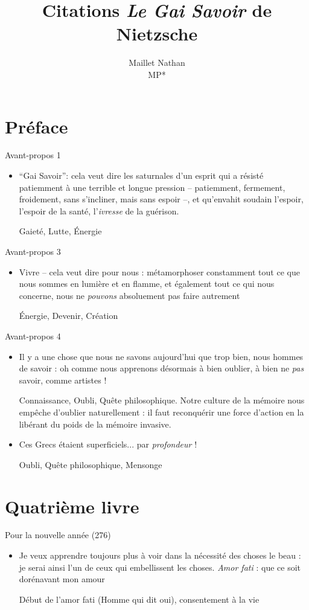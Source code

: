 \documentclass[french,a4paper,11pt,answers]{exam}
\title{Citations \emph{Le Gai Savoir} de Nietzsche}
\author{Maillet Nathan\\MP*}
\date{}
\newcommand{\cit}[2]{\og #1 \fg{} \begin{solution}{ #2 }\end{solution}} %
\begin{document}
	\maketitle
	\section{Préface}
	\begin{cadre}{Avant-propos 1}
		\begin{itemize}
			\item \cit{“Gai Savoir'': cela veut dire les saturnales d'un esprit qui a résisté patiemment à une terrible et longue pression -- patiemment, fermement, froidement, sans s'incliner, mais sans espoir --, et qu'envahit soudain l'espoir, l'espoir de la santé, l'\emph{ivresse} de la guérison.}
				{Gaieté, Lutte, Énergie}
		\end{itemize}
	\end{cadre}
	
	\begin{cadre}{Avant-propos 3}
		\begin{itemize}
			\item \cit{Vivre -- cela veut dire pour nous : métamorphoser constamment tout ce que nous sommes en lumière et en flamme, et également tout ce qui nous concerne, nous ne \emph{pouvons} absoluement pas faire autrement}
				{Énergie, Devenir, Création}
		\end{itemize}
	\end{cadre}

	\begin{cadre}{Avant-propos 4}
		\begin{itemize}
			\item \cit{Il y a une chose que nous ne savons aujourd'hui que trop bien, nous hommes de savoir : oh comme nous apprenons désormais à bien oublier, à bien ne \emph{pas} savoir, comme artistes !}
				{Connaissance, Oubli, Quête philosophique. Notre culture de la mémoire nous empêche d'oublier naturellement : il faut reconquérir une force d'action en la libérant du poids de la mémoire invasive.}
			\item \cit{Ces Grecs étaient superficiels... par \emph{profondeur} !}
				{Oubli, Quête philosophique, Mensonge}
		\end{itemize}
	\end{cadre}

	\section{Quatrième livre}
	\begin{cadre}{Pour la nouvelle année (276)}
		\begin{itemize}
			\item \cit{Je veux apprendre toujours plus à voir dans la nécessité des choses le beau : je serai ainsi l'un de ceux qui embellissent les choses. \emph{Amor fati} : que ce soit dorénavant mon amour}
				{Début de l'amor fati (Homme qui dit oui), consentement à la vie}
		\end{itemize}
	\end{cadre}
	
\end{document}
